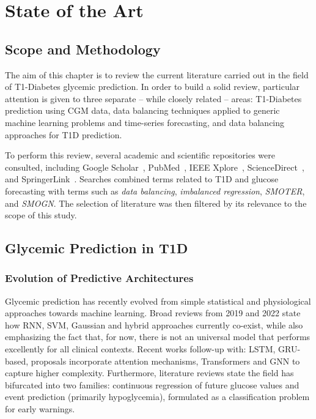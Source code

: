 
\chapter{State of the Art}
\label{chap:SoA}

\section{Scope and Methodology}
\label{sec:soa_scope_and_metholodogy}

The aim of this chapter is to review the current literature carried out in the field of T1-Diabetes glycemic prediction. In order to build a solid review, particular attention is given to three separate -- while closely related -- areas: T1-Diabetes prediction using CGM data, data balancing techniques applied to generic machine learning problems and time-series forecasting, and data balancing approaches for T1D prediction.

To perform this review, several academic and scientific repositories were consulted, including Google Scholar~\cite{google_scholar}, PubMed~\cite{pubmed}, IEEE Xplore~\cite{ieee_xplore}, ScienceDirect~\cite{sciencedirect}, and SpringerLink~\cite{springerlink}. Searches combined terms related to T1D and glucose forecasting with terms such as \textit{data balancing}, \textit{imbalanced regression}, \textit{SMOTER}, and \textit{SMOGN}. The selection of literature was then filtered by its relevance to the scope of this study.

\section{Glycemic Prediction in T1D}
\label{sec:soa_glycemic_prediction}

\subsection{Evolution of Predictive Architectures}
\label{subsec:soa_prediction_evolution}

Glycemic prediction has recently evolved from simple statistical and physiological approaches towards machine learning. Broad reviews from 2019 \cite{WOLDAREGAY2019109} and 2022 \cite{info:doi/10.2196/34699} state how RNN, SVM, Gaussian and hybrid approaches currently co-exist, while also emphasizing the fact that, for now, there is not an universal model that performs excellently for all clinical contexts. Recent works \cite{WOLDAREGAY2019109, info:doi/10.2196/34699} follow-up with: LSTM, GRU-based, proposals incorporate attention mechanisms, Transformers and GNN to capture higher complexity. Furthermore, literature reviews \cite{info:doi/10.2196/34699} state the field has bifurcated into two families: continuous regression of future glucose values and event prediction (primarily hypoglycemia), formulated as a classification problem for early warnings.

